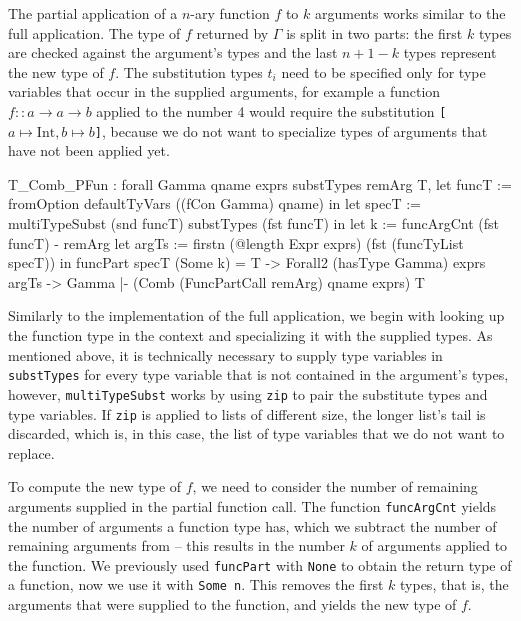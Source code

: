 \documentclass[fleqn, abstract=on]{scrreprt}
\newcommand{\coqinline}[1]{\texttt{#1}}
\begin{document}
\noindent
The partial application of a $n$-ary function $f$ to $k$ arguments works similar to the full application. The type of $f$ returned by $\Gamma$ is split in two parts: the first $k$ types are checked against the argument's types and the last $n + 1 - k$ types represent the new type of $f$. The substitution types $t_{i}$ need to be specified only for type variables that occur in the supplied arguments, for example a function $f :: a \rightarrow a \rightarrow b$ applied to the number 4 would require the substitution \texttt{[$a \mapsto \text{Int}, b \mapsto b$]}, because we do not want to specialize types of arguments that have not been applied yet.
\begin{coqcode}
T_Comb_PFun : forall Gamma qname exprs substTypes remArg T,
                let funcT := fromOption defaultTyVars ((fCon Gamma) qname) in
                let specT := multiTypeSubst (snd funcT) substTypes (fst funcT) in
                let     k := funcArgCnt (fst funcT) - remArg
                let argTs := firstn (@length Expr exprs) (fst (funcTyList specT))
                 in funcPart specT (Some k) = T ->
                    Forall2 (hasType Gamma) exprs argTs ->
              Gamma |- (Comb (FuncPartCall remArg) qname exprs) \in T
\end{coqcode}
Similarly to the implementation of the full application, we begin with looking up the function type in the context and specializing it with the supplied types. As mentioned above, it is technically necessary to supply type variables in \coqinline{substTypes} for every type variable that is not contained in the argument's types, however, \coqinline{multiTypeSubst} works by using \coqinline{zip} to pair the substitute types and type variables. If \coqinline{zip} is applied to lists of different size, the longer list's tail is discarded, which is, in this case, the list of type variables that we do not want to replace.
\par
To compute the new type of $f$, we need to consider the number of remaining arguments supplied in the partial function call. The function \coqinline{funcArgCnt} yields the number of arguments a function type has, which we subtract the number of remaining arguments from -- this results in the number $k$ of arguments applied to the function. We previously used \coqinline{funcPart} with \coqinline{None} to obtain the return type of a function, now we use it with \coqinline{Some n}. This removes the first $k$ types, that is, the arguments that were supplied to the function, and yields the new type of $f$.
\par
\end{document}
